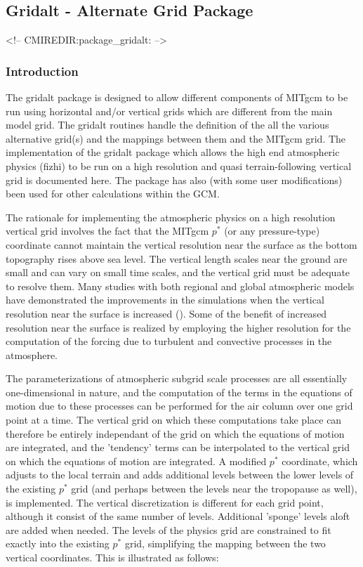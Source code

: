 \subsection{Gridalt - Alternate Grid Package}
\label{sec:pkg:gridalt}
\begin{rawhtml}
<!-- CMIREDIR:package_gridalt: -->
\end{rawhtml}

\subsubsection {Introduction} 

The gridalt package \citep{mol:09} 
is designed to allow different components of MITgcm to
be run using horizontal and/or vertical grids which are different from the main 
model grid. The gridalt routines handle the definition of the all the various
alternative grid(s) and the mappings between them and the MITgcm grid.
The implementation of the gridalt package which allows the high end atmospheric 
physics (fizhi) to be run on a high resolution and quasi terrain-following vertical 
grid is documented here.  The package has also (with some user modifications) been used 
for other calculations within the GCM. 

The rationale for implementing the atmospheric physics on a high resolution vertical
grid involves the fact that the MITgcm $p^*$ (or any pressure-type) coordinate cannot 
maintain the vertical resolution near the surface as the bottom topography rises above
sea level. The vertical length scales near the ground are small and can vary 
on small time scales, and the vertical grid must be adequate to resolve them.
Many studies with both regional and global atmospheric models have demonstrated the 
improvements in the simulations when the vertical resolution near the surface is 
increased (\cite{bm:99,Inn:01,wo:98,breth:99}). Some of the benefit of increased resolution 
near the surface is realized by employing the higher resolution for the computation of the 
forcing due to turbulent and convective processes in the atmosphere.  

The parameterizations of atmospheric subgrid scale processes are all essentially
one-dimensional in nature, and the computation of the terms in the equations of
motion due to these processes can be performed for the air column over one grid point 
at a time.  The vertical grid on which these computations take place can therefore be 
entirely independant of the grid on which the equations of motion are integrated, and 
the 'tendency' terms can be interpolated to the vertical grid on which the equations
of motion are integrated. A modified $p^*$ coordinate, which adjusts to the local 
terrain and adds additional levels between the lower levels of the existing $p^*$ grid 
(and perhaps between the levels near the tropopause as well), is implemented. The 
vertical discretization is different for each grid point, although it consist of the 
same number of levels. Additional 'sponge' levels aloft are added when needed. The levels 
of the physics grid are constrained to fit exactly into the existing $p^*$ grid, simplifying 
the mapping between the two vertical coordinates.  This is illustrated as follows:

